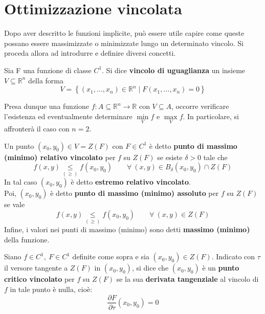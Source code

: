 \section{Ottimizzazione vincolata}
Dopo aver descritto le funzioni implicite, può essere utile capire come queste possano essere massimizzate o minimizzate lungo un determinato vincolo. Si proceda allora ad introdurre e definire diversi concetti.
\begin{definition} \label{Def: Vincolo di uguaglianza}
Sia F una funzione di classe $C^1$. Si dice \textbf{vincolo di uguaglianza} un insieme $V \subseteq \mathbb{R}^n$ della forma
\begin{equation}
    V= \left\{(x_1, \dots, x_n) \in \mathbb{R}^n \mid F(x_1, \dots, x_n)=0 \right\}
\end{equation}
\end{definition}
Presa dunque una funzione $f:A\subseteq \mathbb{R}^n \to \mathbb{R}$ con $V \subseteq A$, occorre verificare l'esistenza ed eventualmente determinare $\min\limits_{V}{f}$ e $\max\limits_{V}{f}$.
In particolare, si affronterà il caso con $n=2$.
\begin{definition} \label{Def: Estremi vincolati}
    Un punto $(x_0, y_0) \in V= Z(F)$ con $F \in C^1$ è detto \textbf{punto di massimo (minimo) relativo vincolato} per $f$ su $Z(F)$ se esiste $\delta>0$ tale che 
    \begin{equation}
        f(x,y) \underset{(\geq)}{\leq} f(x_0, y_0) \qquad \forall\ (x, y) \in B_\delta(x_0, y_0) \cap Z(F)
    \end{equation}
    In tal caso $(x_0, y_0)$ è detto \textbf{estremo relativo vincolato}.\\
    Poi, $(x_0, y_0)$ è detto \textbf{punto di massimo (minimo) assoluto} per $f$ su $Z(F)$ se vale
    \begin{equation}
        f(x, y) \underset{(\geq)}{\leq} f(x_0, y_0) \qquad \forall\ (x, y) \in Z(F)
    \end{equation}
    Infine, i valori nei punti di massimo (minimo) sono detti \textbf{massimo (minimo)} della funzione.
\end{definition}
\begin{definition} \label{Punto critico vincolato}
    Siano $f \in C^1,\ F \in C^1$ definite come sopra e sia $(x_0, y_0) \in Z(F)$. Indicato con $\tau$ il versore tangente a $Z(F)$ in $(x_0, y_0)$, si dice che $(x_0, y_0)$ è un \textbf{punto critico vincolato} per $f$ su $Z(F)$ se la sua \textbf{derivata tangenziale} al vincolo di $f$ in tale punto è nulla, cioè:
    \begin{equation} \label{Eq: Derivata tangenziale}
        \frac{\partial{F}}{\partial \tau}(x_0, y_0)=0 
    \end{equation}
\end{definition}

